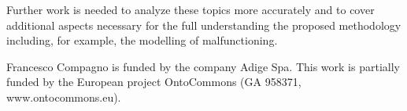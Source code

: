 \documentclass[
]{ceurart}
\begin{document}
Further work is needed to analyze these topics more accurately and to cover additional aspects necessary for the full understanding the proposed methodology including, for example, the modelling of malfunctioning.

\acknowledgments

Francesco Compagno is funded by the company Adige Spa. This work is partially funded by the European project
OntoCommons (GA 958371, www.ontocommons.eu).




\end{document}
